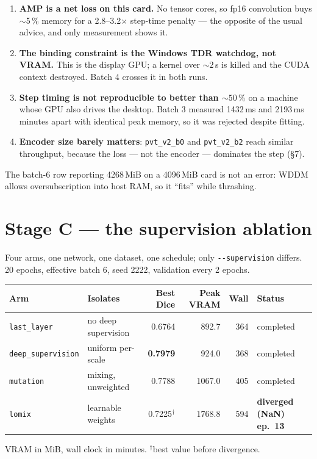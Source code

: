 \documentclass[11pt,a4paper]{article}
\newcommand{\code}[1]{\texttt{\small #1}}
\begin{document}
\begin{enumerate}
\item \textbf{AMP is a net loss on this card.} No tensor cores, so fp16
convolution buys $\sim$5\,\% memory for a 2.8--3.2$\times$ step-time penalty ---
the opposite of the usual advice, and only measurement shows it.
\item \textbf{The binding constraint is the Windows TDR watchdog, not VRAM.}
This is the display GPU; a kernel over ${\sim}2$\,s is killed and the CUDA
context destroyed. Batch 4 crosses it in both runs.
\item \textbf{Step timing is not reproducible to better than ${\sim}50\,\%$} on
a machine whose GPU also drives the desktop. Batch 3 measured 1432\,ms and
2193\,ms minutes apart with identical peak memory, so it was rejected despite
fitting.
\item \textbf{Encoder size barely matters}: \code{pvt\_v2\_b0} and
\code{pvt\_v2\_b2} reach similar throughput, because the loss --- not the
encoder --- dominates the step (\S7).
\end{enumerate}

The batch-6 row reporting 4268\,MiB on a 4096\,MiB card is not an error: WDDM
allows oversubscription into host RAM, so it ``fits'' while thrashing.

\section{Stage C --- the supervision ablation}

Four arms, one network, one dataset, one schedule; only \code{-{}-supervision}
differs. 20 epochs, effective batch 6, seed 2222, validation every 2 epochs.

\begin{center}
\begin{tabular}{@{}llrrrl@{}}
\toprule
\textbf{Arm} & \textbf{Isolates} & \textbf{Best Dice} & \textbf{Peak VRAM} &
\textbf{Wall} & \textbf{Status} \\
\midrule
\code{last\_layer} & no deep supervision & 0.6764 & 892.7 & 364 & completed \\
\code{deep\_supervision} & uniform per-scale & \textbf{0.7979} & 924.0 & 368 & completed \\
\code{mutation} & mixing, unweighted & 0.7788 & 1067.0 & 405 & completed \\
\code{lomix} & learnable weights & 0.7225$^\dagger$ & 1768.8 & 594 & \textbf{diverged (NaN) ep.\ 13} \\
\bottomrule
\end{tabular}
\end{center}
{\small VRAM in MiB, wall clock in minutes. $^\dagger$best value before divergence.}
\end{document}
